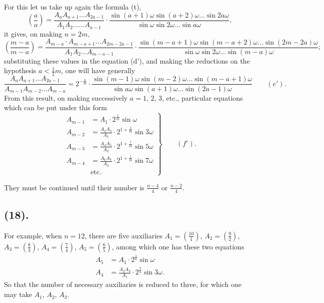 \documentclass{article}
\begin{document}
For this let us take up again the formula (t),
\[ \left(\frac{a}{a}\right)=\frac{A_{a}A_{a+1}\ldots A_{2a-1}}{A_{1}A_{2}\ldots\ldots A_{a-1}}\cdot\frac{\sin(a+1)\omega\sin(a+2)\omega\ldots\sin 2a\omega}{\sin\omega\sin 2\omega\ldots\sin a\omega}, \]
it gives, on making $n=2m$,
\[ \left(\frac{m-a}{m-a}\right)=\frac{A_{m-a}\cdot A_{m-a+1}\ldots A_{2m-2a-1}}{A_{1}A_{2}\ldots A_{m-a-1}}\cdot\frac{\sin(m-a+1)\omega\sin(m-a+2)\omega\ldots\sin(2m-2a)\omega}{\sin\omega\sin 2\omega\ldots\sin(m-a)\omega}; \]
substituting these values in the equation (d'), and making the reductions on the hypothesis $a<\frac{1}{2}m$, one will have generally
\[ \frac{A_{a}A_{a+1}\ldots A_{2a-1}}{A_{m-1}A_{m-2}\ldots A_{m-a}}=2^{-\frac{a}{m}}\cdot\frac{\sin(m-1)\omega\sin(m-2)\omega\ldots\sin(m-a+1)\omega}{\sin a\omega\sin(a+1)\omega\ldots\sin(2a-1)\omega}\qquad(e'). \]
From this result, on making successively $a=1$, $2$, $3$, etc., particular equations which can be put under this form
\[ \left.\begin{aligned} A_{m-1}&=A_{1}\cdot 2^{\frac{1}{m}}\sin\omega\\ A_{m-2}&=\frac{A_{2}A_{3}}{A_{1}}\cdot 2^{1+\frac{1}{m}}\sin 3\omega\\ A_{m-3}&=\frac{A_{4}A_{5}}{A_{2}}\cdot 2^{1+\frac{1}{m}}\sin 5\omega\\ A_{m-4}&=\frac{A_{6}A_{7}}{A_{3}}\cdot 2^{1+\frac{1}{m}}\sin 7\omega\\ &\text{etc.} \end{aligned}\right\}\qquad(f'). \]

They must be continued until their number is $\frac{n-4}{4}$ or $\frac{n-2}{4}$.

\subsection*{(18).}

For example, when $n=12$, there are five auxiliaries $A_{1}=\left(\frac{10}{1}\right)$, $A_{2}=\left(\frac{9}{2}\right)$, $A_{3}=\left(\frac{8}{3}\right)$, $A_{4}=\left(\frac{7}{4}\right)$, $A_{5}=\left(\frac{6}{5}\right)$, among which one has these two equations
\[ \begin{aligned} A_{5}&=A_{1}\cdot 2^{\frac{1}{6}}\sin\omega\\ A_{4}&=\frac{A_{2}A_{3}}{A_{1}}\cdot 2^{\frac{7}{6}}\sin 3\omega. \end{aligned} \]
So that the number of necessary auxiliaries is reduced to three, for which one may take $A_{1}$, $A_{2}$, $A_{3}$.
\end{document}
